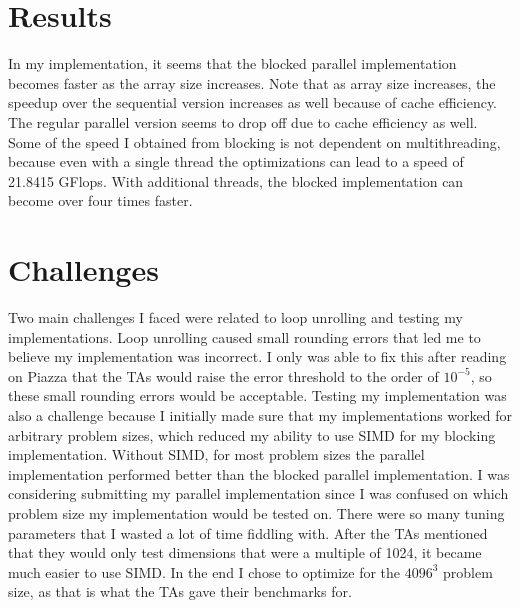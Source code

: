 \documentclass[12pt]{article}
\begin{document}
\section{Results}

In my implementation, it seems that the blocked parallel implementation becomes faster as the array size increases. Note that
as array size increases, the speedup over the sequential version increases as well because of cache efficiency. The regular
parallel version seems to drop off due to cache efficiency as well. Some of the speed I obtained from blocking is not dependent on
multithreading, because even with a single thread the optimizations can lead to a speed of 21.8415 GFlops. With additional threads,
the blocked implementation can become over four times faster.

\section{Challenges}

Two main challenges I faced were related to loop unrolling and testing my implementations. Loop unrolling caused small
rounding errors that led me to believe my implementation was incorrect. I only was able to fix this after reading on Piazza
that the TAs would raise the error threshold to the order of \(10^{-5}\), so these small rounding errors would be acceptable.
Testing my implementation was also a challenge because I initially made sure that my implementations worked for arbitrary problem sizes,
which reduced my ability to use SIMD for my blocking implementation. Without SIMD, for most problem sizes the parallel implementation
performed better than the blocked parallel implementation. I was considering submitting my parallel implementation since I was confused on which
problem size my implementation would be tested on. There were so many tuning parameters that I wasted a lot of time fiddling with.
After the TAs mentioned that they would only test dimensions that were a multiple of 1024, it became much easier to use SIMD.
In the end I chose to optimize for the \(4096^3\) problem size, as that is what the TAs gave their benchmarks for.
\end{document}
